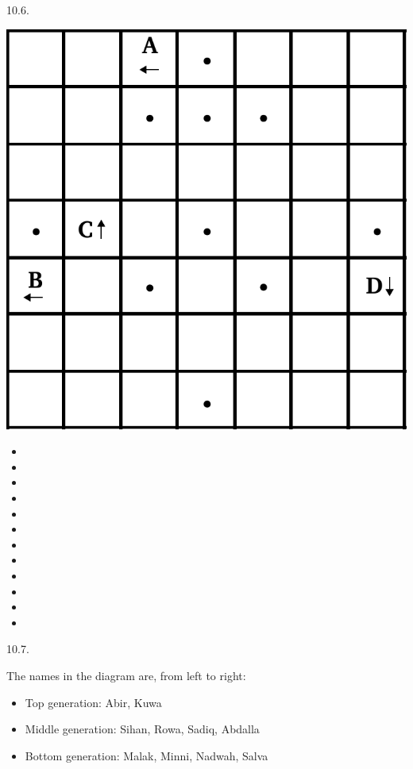 \begin{refsection}
\begin{practiceproblemsolution}{10.6. \langnameHungarian}
\begin{center}
\includegraphics[width = 8 cm]{figures/Hungarian_Squares_solution.pdf}
\end{center}
\begin{multicols}{3}
\begin{itemize}[noitemsep]
    \item[] 
    \item[] 
    \item[] 
    \item[] 
    \item[] 
    \item[] 
    \item[] 
    \item[] 
    \item[] 
    \item[] 
    \item[] 
    \item[] \quad
\end{itemize}
\end{multicols}
\end{practiceproblemsolution}



\begin{practiceproblemsolution}{10.7. \langnameTabaq}

\begin{solutions}[label=Solution 10.7\alph*]
    \item The names in the diagram are, from left to right:

    \begin{itemize}
        \item[] Top generation: Abir, Kuwa
        \item[] Middle generation: Sihan, Rowa, Sadiq, Abdalla
        \item[] Bottom generation: Malak, Minni, Nadwah, Salva
    \end{itemize}
    \item
    \begin{enumerate}[label = \alph*.]


\end{enumerate}
\end{solutions}
\end{practiceproblemsolution}
\end{refsection}
